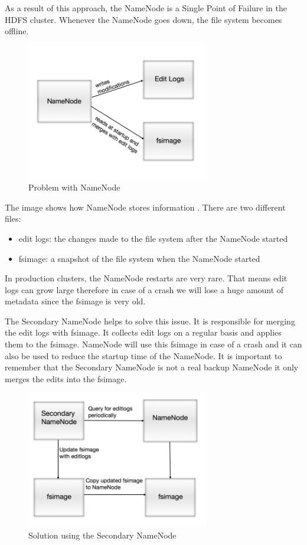 As a result of this approach, the NameNode is a Single Point of Failure in the HDFS cluster. Whenever the NameNode goes down, the file system becomes offline.
\begin{figure}[H]
	\includegraphics[width=80mm, keepaspectratio]{figures/namenode_problem.png}
	\centering
	\caption{Problem with NameNode}
\end{figure}
The image shows how NameNode stores information \cite{Secondary-NameNode}. There are two different files:
\begin{itemize}
	\item edit logs: the changes made to the file system after the NameNode started
	\item fsimage: a snapshot of the file system when the NameNode started
\end{itemize}
In production clusters, the NameNode restarts are very rare. That means edit logs can grow large therefore in case of a crash we will lose a huge amount of metadata since the fsimage is very old.

The Secondary NameNode helps to solve this issue. It is responsible for merging the edit logs with fsimage. It collects edit logs on a regular basis and applies them to the fsimage. NameNode will use this fsimage in case of a crash and it can also be used to reduce the startup time of the NameNode.
It is important to remember that the Secondary NameNode is not a real backup NameNode it only merges the edits into the fsimage. 

\begin{figure}[H]
	\includegraphics[width=80mm, keepaspectratio]{figures/secondary_namenode.png}
	\centering
	\caption{Solution using the Secondary NameNode}
\end{figure}


